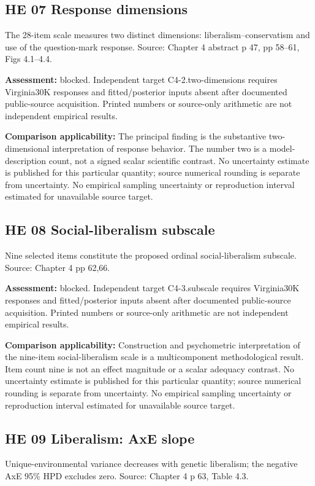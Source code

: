 \documentclass[11pt]{article}
\begin{document}
\subsection{HE 07 Response dimensions}\label{head:HE07}
The 28-item scale measures two distinct dimensions: liberalism--conservatism and use of the question-mark response. Source: Chapter 4 abstract p 47, pp 58--61, Figs 4.1--4.4.

\textbf{Assessment:} blocked. Independent target C4-2.two-dimensions requires Virginia30K responses and fitted/posterior inputs absent after documented public-source acquisition. Printed numbers or source-only arithmetic are not independent empirical results.

\textbf{Comparison applicability:} The principal finding is the substantive two-dimensional interpretation of response behavior. The number two is a model-description count, not a signed scalar scientific contrast. No uncertainty estimate is published for this particular quantity; source numerical rounding is separate from uncertainty. No empirical sampling uncertainty or reproduction interval estimated for unavailable source target.
\subsection{HE 08 Social-liberalism subscale}\label{head:HE08}
Nine selected items constitute the proposed ordinal social-liberalism subscale. Source: Chapter 4 pp 62,66.

\textbf{Assessment:} blocked. Independent target C4-3.subscale requires Virginia30K responses and fitted/posterior inputs absent after documented public-source acquisition. Printed numbers or source-only arithmetic are not independent empirical results.

\textbf{Comparison applicability:} Construction and psychometric interpretation of the nine-item social-liberalism scale is a multicomponent methodological result. Item count nine is not an effect magnitude or a scalar adequacy contrast. No uncertainty estimate is published for this particular quantity; source numerical rounding is separate from uncertainty. No empirical sampling uncertainty or reproduction interval estimated for unavailable source target.
\subsection{HE 09 Liberalism: AxE slope}\label{head:HE09}
Unique-environmental variance decreases with genetic liberalism; the negative AxE 95\% HPD excludes zero. Source: Chapter 4 p 63, Table 4.3.
\end{document}
